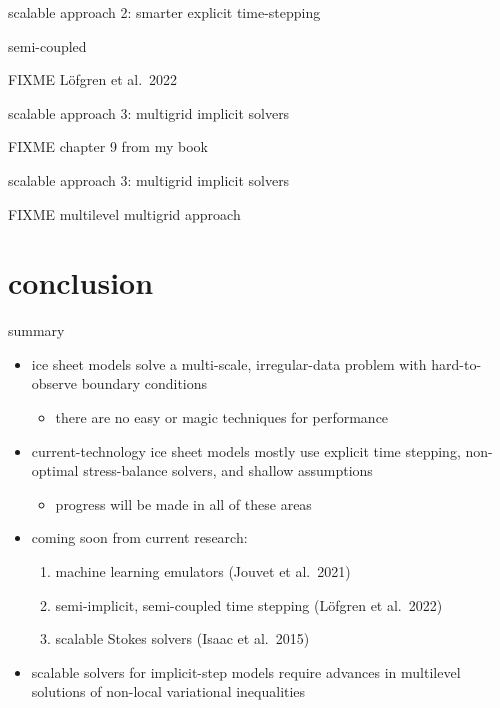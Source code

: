 \documentclass[svgnames,
               hyperref={colorlinks,citecolor=DeepPink4,linkcolor=FireBrick,urlcolor=Maroon},
               usepdftitle=false]  %
               {beamer}
\begin{document}
\begin{frame}{scalable approach 2: smarter explicit time-stepping}

semi-coupled

FIXME L{\"o}fgren et al.~2022
\end{frame}


\begin{frame}{scalable approach 3: multigrid implicit solvers}

FIXME chapter 9 from my book
\end{frame}

\begin{frame}{scalable approach 3: multigrid implicit solvers}

FIXME multilevel multigrid approach
\end{frame}


\section{conclusion}

\begin{frame}{\alert{summary}}

\begin{itemize}
\item ice sheet models solve a multi-scale, irregular-data problem with hard-to-observe boundary conditions
   \begin{itemize}
   \item[$\circ$] there are \alert{no easy or magic techniques} for performance
   \end{itemize}
\item<2-> current-technology ice sheet models mostly use \alert{explicit} time stepping, \alert{non-optimal} stress-balance solvers, and \alert{shallow} assumptions
   \begin{itemize}
   \item[$\circ$] progress will be made in all of these areas
   \end{itemize}
\item<3-> \alert{coming soon} from current research:
   \begin{enumerate}
   \item[1.] machine learning emulators (Jouvet et al.~2021)
   \item[2.] semi-implicit, semi-coupled time stepping (L{\"o}fgren et al.~2022)
   \item[3.] scalable Stokes solvers (Isaac et al.~2015)   
   \end{enumerate}
\item<4-> scalable solvers for implicit-step models require advances in \alert{multilevel solutions of non-local variational inequalities}
\end{itemize}
\end{frame}
\end{document}
